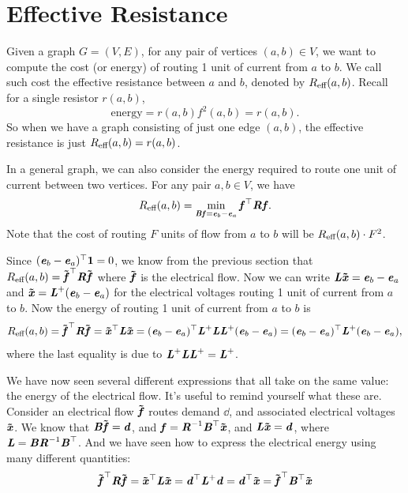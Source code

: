 \section{Effective Resistance}
Given a graph $G=(V,E)$, for any pair of vertices $(a,b)\in V$, we
want to compute the cost (or energy) of routing 1 unit of current
from $a$ to $b$. We call such cost the effective resistance between
$a$ and $b$, denoted by $\er(a,b)$. Recall for a single resistor
$r(a,b)$,
\[
  \text{energy} =r(a,b)f^2(a,b)=r(a,b)
  .
\]
So when we have a graph consisting of just one edge
$(a,b)$, the effective resistance is just $\er(a,b)=r(a,b)$.

In a general graph, we can also consider the energy required to route
one unit of current between two vertices.
For any pair $a,b\in V$, we have
\[ \er(a,b) = \min_{\BB\ff=\ee_b-\ee_a} \ff^\trp\RR\ff. \]
Note that the cost of routing $F$ units of flow from $a$ to $b$ will be $\er(a,b)\cdot F^2$.

Since $(\ee_b-\ee_a)^\trp\matone=0$, we know from the previous section
that $\er(a,b) = \fftil^\trp\RR\fftil$ where $\fftil$ is the
electrical flow.
Now we can write
$\LL\xxtil=\ee_b-\ee_a$ and $\xxtil=\LL^{\pinv}(\ee_b-\ee_a)$ for the
electrical voltages routing 1 unit of current from $a$ to $b$.
Now the energy of routing 1 unit of current from $a$ to $b$ is
\[ \er(a,b) = \fftil^\trp\RR\fftil = \xxtil^\trp\LL\xxtil =  (\ee_b-\ee_a)^\trp\LL^{\pinv}\LL\LL^{\pinv}(\ee_b-\ee_a) = (\ee_b-\ee_a)^\trp\LL^{\pinv}(\ee_b-\ee_a), \]
where the last equality is due to
$\LL^{\pinv}\LL\LL^{\pinv}=\LL^{\pinv}$.

\begin{remark}
  We have now seen several different expressions that all take on the
  same value: the energy of the electrical flow.
  It's useful to remind yourself what these are.
  Consider an electrical flow $\fftil$ routes demand $\dd$, and
  associated electrical voltages
  $\xxtil$.
  We know that $\BB \fftil = \dd$, and $\ff = \RR^{-1} \BB^{\trp}
  \xxtil$,
  and $\LL \xxtil = \dd$, where $\LL = \BB \RR^{-1} \BB^{\trp}$.
  And we have seen how to express the electrical energy using many
  different quantities:
  \[
     \fftil^\trp\RR\fftil  =  \xxtil^\trp\LL\xxtil = \dd^\trp \LL^{\pinv}
     \dd =\dd^\trp\xxtil = \fftil^{\trp}\BB^{\trp} \xxtil
   \]
\end{remark}

